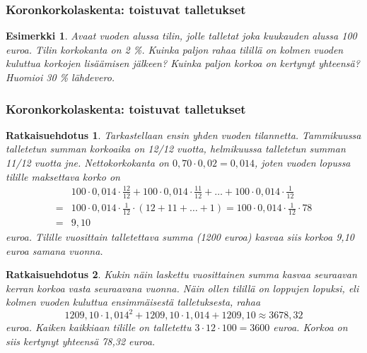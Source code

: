 \documentclass[]{beamer}\usepackage[]{graphicx}\usepackage[]{color}
\newtheorem{esim}{Esimerkki}
\newtheorem{ratkaisu}{Ratkaisuehdotus}
\begin{document}
\begin{frame}
    \frametitle{Koronkorkolaskenta: toistuvat talletukset}
    \pause
    \begin{esim}
        Avaat vuoden alussa tilin, jolle talletat joka kuukauden alussa 100 euroa.
        Tilin korkokanta on 2 \%. Kuinka paljon rahaa tilillä on kolmen vuoden kuluttua korkojen lisäämisen jälkeen?
        Kuinka paljon korkoa on kertynyt yhteensä? Huomioi 30 \% lähdevero.
    \end{esim}
\end{frame}

\begin{frame}
    \frametitle{Koronkorkolaskenta: toistuvat talletukset}
    \pause
    \begin{ratkaisu}
      \pause
        Tarkastellaan ensin yhden vuoden tilannetta. 
        \pause
        Tammikuussa talletetun summan korkoaika on 12/12 vuotta, helmikuussa
        talletetun summan 11/12 vuotta jne. 
        \pause Nettokorkokanta on \(0,70\cdot 0,02 = 0,014\),
        joten vuoden lopussa tilille maksettava korko on 
        \pause
        \begin{align*}
             &100\cdot0,014\cdot\frac{12}{12} + 100\cdot0,014\cdot\frac{11}{12} + \ldots + 100\cdot0,014\cdot\frac{1}{12}\\
            =&100\cdot0,014\cdot\frac{1}{12}\cdot(12+11+\ldots+1) = 100\cdot0,014\cdot\frac{1}{12}\cdot78\\
            =&9,10
        \end{align*}
        euroa. 
        \pause Tilille vuosittain talletettava summa (1200 euroa) kasvaa siis korkoa 9,10 euroa samana vuonna.
    \end{ratkaisu}
\end{frame}

\begin{frame}
    \begin{ratkaisu}
        Kukin näin laskettu vuosittainen summa kasvaa seuraavan kerran korkoa vasta seuraavana vuonna.
        \pause
        Näin ollen tilillä on loppujen lopuksi, eli kolmen vuoden kuluttua ensimmäisestä talletuksesta, rahaa \pause
        \[
            1209,10\cdot 1,014^2+1209,10\cdot1,014+1209,10\approx 3678,32
        \]
        euroa.
        \pause
        Kaiken kaikkiaan tilille on talletettu \(3\cdot12\cdot100 = 3600\) euroa.
        \pause
        Korkoa on siis kertynyt yhteensä 78,32 euroa.
    \end{ratkaisu}
\end{frame}
\end{document}
